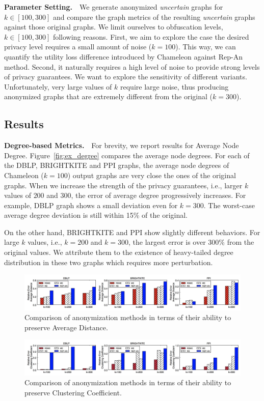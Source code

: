 \textbf{Parameter Setting.}~~We generate anonymized \emph{uncertain} graphs for $k \in [100,300]$ and compare the graph metrics of the resulting \emph{uncertain} graphs against those original graphs. We limit ourselves to obfuscation levels, $k \in [100,300]$ following reasons. 
First, we aim to explore the case the desired privacy level requires a small amount of noise ($k=100$). This way, we can quantify the utility loss difference introduced by Chameleon against Rep-An method. Second, it naturally requires a high level of noise to provide strong levels of privacy guarantees. We want to explore the sensitivity of different variants. Unfortunately, very large values of $k$ require large noise, thus producing anonymized graphs that are extremely different from the original ($k=300$). 


\subsection{Results}
\textbf{Degree-based Metrics.}~~For brevity, we report results for  Average Node Degree. 
Figure~\ref{fig:ex_degree} compares the average node degrees. For each of the DBLP, BRIGHTKITE and PPI graphs, the average node degrees of Chameleon ($k=100$) output graphs are very close the ones of the original graphs. When we increase the strength of the privacy guarantees, i.e., larger $k$ values of $200$ and $300$, the error of average degree progressively increases. For example, DBLP graph shows a small deviation even for $k=300$. The worst-case average degree deviation is still within 15\% of the original. 

On the other hand, BRIGHTKITE and PPI show slightly different behaviors. For large $k$ values, i.e., $k=200$ and $k=300$, the largest error is over 300\% from the original values. We attribute them to the existence of heavy-tailed degree distribution in these two graphs which requires more perturbation. 
\begin{figure}[!tb]
    \centering
    \includegraphics[width=\linewidth]{exp/exp_apd.jpg}
    \caption{Comparison of anonymization methods in terms of their ability to preserve Average Distance.}
    \label{fig:ex_apd}
\end{figure}
\vspace{-10pt}
\begin{figure}[!tb]
    \centering
    \includegraphics[width=\linewidth]{exp/exp_cc.jpg}
    \caption{Comparison of anonymization methods in terms of their ability to preserve Clustering Coefficient.}
    \label{fig:ex_cc}
\end{figure}
\vspace{-10pt}

